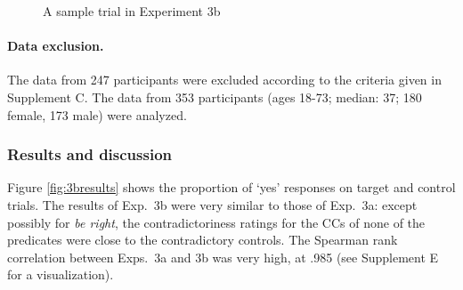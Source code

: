 \documentclass{language}
\newcommand{\6}{\mbox{$[\hspace*{-.6mm}[$}}
\newcommand{\9}{\mbox{$]\hspace*{-.6mm}]$}}
\begin{document}
\begin{figure}[h!]
\begin{center}
\end{center}
\caption{A sample trial in Experiment 3b}\label{fig-trial-exp3b}
\end{figure}


\paragraph{Data exclusion.} The data from 247 participants were excluded according to the criteria given in Supplement C. The data from 353 participants (ages 18-73; median: 37; 180 female, 173 male) were analyzed.
    


\subsubsection{Results and discussion}

Figure \ref{fig:3bresults} shows the proportion of `yes' responses on target and control trials. The results of Exp.~3b were very similar to those of Exp.~3a: except possibly for {\em be right}, the contradictoriness ratings for the CCs of none of the predicates were close to the contradictory controls. The Spearman rank correlation between Exps.~3a and 3b was very high, at .985 (see Supplement E for a visualization).
\end{document}
